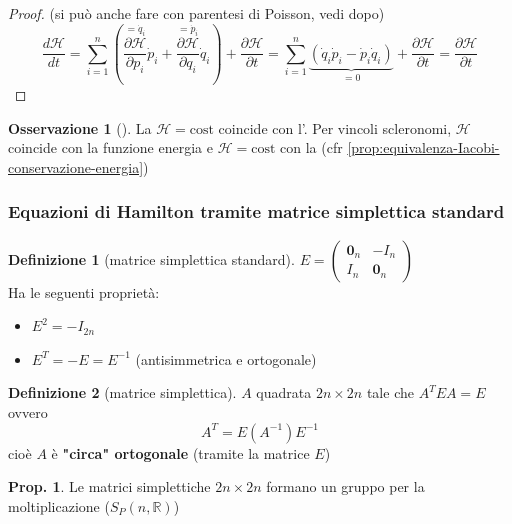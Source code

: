 \documentclass[a4paper,10pt]{article}
\theoremstyle{definition}
\theoremstyle{indentdefinition}
\newtheorem{defn}{Definizione}[section]
\theoremstyle{indenttheorem}
\newtheorem{prop}{Prop.}
\theoremstyle{myremark}
\newtheorem*{rem*}{Osservazione}
\theoremstyle{indentgeneral}
\begin{document}
\begin{proof} (si può anche fare con parentesi di Poisson, vedi dopo)
$$\frac{d\mathcal{H}}{dt}=\sum_{i=1}^{n}\left(\overset{=\dot{q}_i}{\boxed{\frac{\partial\mathcal{H}}{\partial p_{i}}}}\dot{p}_{i}+\overset{=\dot{p}_i}{\boxed{\frac{\partial\mathcal{H}}{\partial q_{i}}}}\dot{q}_{i}\right)+{\frac{\partial\mathcal{H}}{\partial t}}=\sum_{i=1}^{n}\underbrace{\left(\dot{q}_{i}\dot{p}_{i}-\dot{p}_{i}\dot{q}_{i}\right)}_{=0}+{\frac{\partial\mathcal{H}}{\partial t}}={\frac{\partial\mathcal{H}}{\partial t}}$$
\end{proof}
\begin{rem*}[]
La  $\mathcal{H}=\text{cost}$
coincide con l'. Per vincoli scleronomi,
$\mathcal{H}$ coincide con la funzione energia e $\mathcal{H}=\text{cost}$
con la  (cfr \ref{prop:equivalenza-Iacobi-conservazione-energia})
\end{rem*}

\subsubsection{Equazioni di Hamilton tramite matrice simplettica standard}
\begin{defn}[matrice simplettica standard]
\label{def:matrice-simplettica-standard} $E=\begin{pmatrix}\boldsymbol{0}_{n} & -I_{n}\\
I_{n} & \boldsymbol{0}_{n}
\end{pmatrix}$ \\
Ha le seguenti proprietà:
\begin{itemize}
    \item $E^{2}=-I_{2n}$
    \item  $E^{T}=-E=E^{-1}$ (antisimmetrica e ortogonale)
\end{itemize} 
\end{defn}
\begin{defn}[matrice simplettica]
\label{def:matrice-simplettica} $A$ quadrata $2n\times2n$ tale
che $A^{T}EA=E$ ovvero
$$A^{T}=E(A^{-1})E^{-1}$$
cioè $A$ è \textbf{"circa" ortogonale} (tramite la matrice $E$)
\end{defn}

\begin{prop}
Le matrici simplettiche $2n\times2n$ formano un gruppo per la moltiplicazione
($S_{P}\left(n,\mathbb{R}\right)$)
\end{prop}
\end{document}

